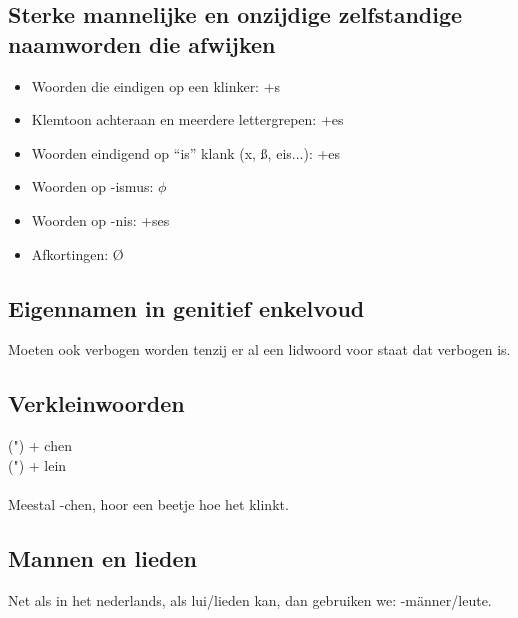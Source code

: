 \documentclass[main.tex]{subfiles}
\begin{document}
\subsection{Sterke mannelijke en onzijdige zelfstandige naamworden die afwijken}
\begin{itemize}
\item Woorden die eindigen op een klinker: +s
\item Klemtoon achteraan en meerdere lettergrepen:	+es
\item Woorden eindigend op “is” klank (x, ß, eis...):	+es
\item Woorden op -ismus:					$\phi$
\item Woorden op -nis:				+ses
\item Afkortingen:						Ø
\end{itemize}

\subsection{Eigennamen in genitief enkelvoud}
Moeten ook verbogen worden tenzij er al een lidwoord voor staat dat verbogen is.
\subsection{Verkleinwoorden}
(") + chen\\
(") + lein\\
\\
Meestal -chen, hoor een beetje hoe het klinkt.
\subsection{Mannen en lieden}
Net als in het nederlands, als lui/lieden kan, dan gebruiken we: -männer/leute.
\end{document}

